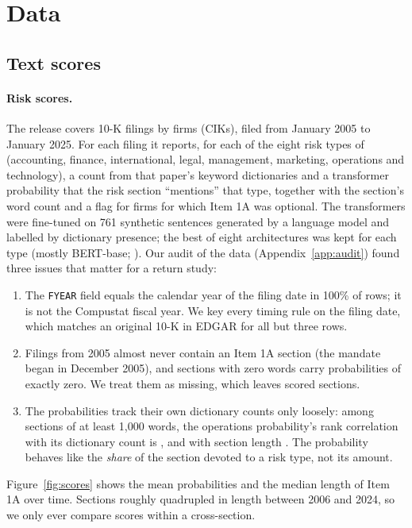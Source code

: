 \documentclass[11pt,a4paper]{article}
\begin{document}
\section{Data}\label{sec:data}

\subsection{Text scores}

\paragraph{Risk scores.} The \citet{astvansh2026} release covers \NFilings{} 10-K filings by \NFirmsScores{} firms (CIKs),
filed from January 2005 to January 2025. For each filing it reports, for each of the eight risk types of
\citet{schnatterly2021} (accounting, finance, international, legal, management, marketing, operations and technology), a
count from that paper's keyword dictionaries
and a transformer probability that the risk section ``mentions'' that type, together with the section's word count and a
flag for firms for which Item 1A was optional. The transformers were fine-tuned on 761 synthetic sentences generated by a
language model and labelled by dictionary presence; the best of eight architectures was kept for each type (mostly
BERT-base; \citealp{devlin2019}). Our audit of the data (Appendix~\ref{app:audit}) found three issues that matter for a
return study:
\begin{enumerate}
  \item The \texttt{FYEAR} field equals the calendar year of the filing date in 100\% of rows; it is not the Compustat fiscal
  year. We key every timing rule on the filing date, which matches an original 10-K in EDGAR for all but three rows.
  \item Filings from 2005 almost never contain an Item 1A section (the mandate began in December 2005), and
  sections with zero words carry probabilities of exactly zero. We treat them as missing, which leaves \NFilingsScored{}
  scored sections.
  \item The probabilities track their own dictionary counts only loosely: among sections of at least 1,000 words, the
  operations probability's rank correlation with its dictionary count is \OpsCountRho, and with section length
  \OpsWordsRho. The probability behaves like the \emph{share} of the section devoted to a risk type, not its amount.
\end{enumerate}
Figure~\ref{fig:scores} shows the mean probabilities and the median length of Item 1A over time. Sections roughly
quadrupled in length between 2006 and 2024, so we only ever compare scores within a cross-section.
\end{document}
